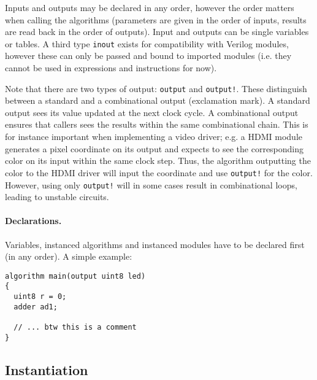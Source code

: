 \documentclass[a4]{article}
\newcommand\verilog{Verilog}
\begin{document}
Inputs and outputs may be declared in any order, however the order matters when calling the algorithms (parameters are given in the order of inputs, results are read back in the order of outputs). Input and outputs can be single variables or tables.
A third type \texttt{inout} exists for compatibility with \verilog{} modules, however these can only be passed and bound to imported modules (i.e. they cannot be used in expressions and instructions for now).

Note that there are two types of output: \texttt{output} and \texttt{output!}. These distinguish between a standard and a combinational output (exclamation mark). A standard output sees its value updated at the next clock cycle. A combinational output ensures that callers sees the results within the same combinational chain. This is for instance important when implementing a video driver; e.g. a HDMI module generates a pixel coordinate on its output and expects to see the corresponding color on its input within the same clock step. Thus, the algorithm outputting the color to the HDMI driver will input the coordinate and use \texttt{output!} for the color. However, using only \texttt{output!} will in some cases result in combinational loops, leading to unstable circuits.


\paragraph{Declarations.} Variables, instanced algorithms and instanced modules have to be declared first (in any order). A simple example:

\begin{verbatim}
algorithm main(output uint8 led)
{
  uint8 r = 0;
  adder ad1;
  
  // ... btw this is a comment
}
\end{verbatim}


\subsection{Instantiation}
\label{sec:instantiation}
\end{document}
